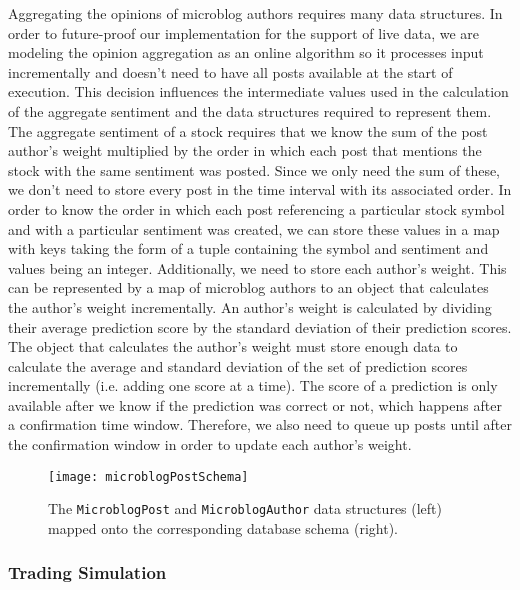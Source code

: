 Aggregating the opinions of microblog authors requires many data structures. In order to future-proof our implementation for the support of live data, we are modeling the opinion aggregation as an online algorithm so it processes input incrementally and doesn't need to have all posts available at the start of execution. This decision influences the intermediate values used in the calculation of the aggregate sentiment and the data structures required to represent them. The aggregate sentiment of a stock requires that we know the sum of the post author's weight multiplied by the order in which each post that mentions the stock with the same sentiment was posted. Since we only need the sum of these, we don't need to store every post in the time interval with its associated order. In order to know the order in which each post referencing a particular stock symbol and with a particular sentiment was created, we can store these values in a map with keys taking the form of a tuple containing the symbol and sentiment and values being an integer. Additionally, we need to store each author's weight. This can be represented by a map of microblog authors to an object that calculates the author's weight incrementally. An author's weight is calculated by dividing their average prediction score by the standard deviation of their prediction scores. The object that calculates the author's weight must store enough data to calculate the average and standard deviation of the set of prediction scores incrementally (i.e. adding one score at a time). The score of a prediction is only available after we know if the prediction was correct or not, which happens after a confirmation time window. Therefore, we also need to queue up posts until after the confirmation window in order to update each author's weight.

\begin{figure}[h]
  \label{microblogPostSchema}
  \begin{center}
    \texttt{[image: microblogPostSchema]}
  \end{center}
  \caption{The \texttt{MicroblogPost} and \texttt{MicroblogAuthor} data structures (left) mapped onto the corresponding database schema (right).}
\end{figure}

\subsubsection{Trading Simulation}

